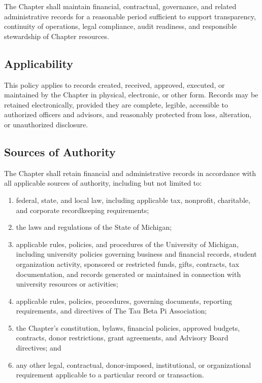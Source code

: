 The Chapter shall maintain financial, contractual, governance, and related administrative records for a reasonable 
period sufficient to support transparency, continuity of operations, legal compliance, audit readiness, and responsible stewardship of Chapter resources.

\subsection{Applicability} \label{XII.1}
This policy applies to records created, received, approved, executed, or maintained by the Chapter in physical, electronic, or other form. 
Records may be retained electronically, provided they are complete, legible, accessible to authorized officers and advisors, and 
reasonably protected from loss, alteration, or unauthorized disclosure.

\subsection{Sources of Authority} \label{XII.2}
The Chapter shall retain financial and administrative records in accordance with all applicable sources of authority, including but not limited to:
\begin{enumerate}
    \item federal, state, and local law, including applicable tax, nonprofit, charitable, and corporate recordkeeping requirements;
    \item the laws and regulations of the State of Michigan;
    \item applicable rules, policies, and procedures of the University of Michigan, including university policies governing business and financial records, 
    student organization activity, sponsored or restricted funds, gifts, contracts, tax documentation, and records generated or maintained in connection with university resources or activities;
    \item applicable rules, policies, procedures, governing documents, reporting requirements, and directives of The Tau Beta Pi Association;
    \item the Chapter’s constitution, bylaws, financial policies, approved budgets, contracts, donor restrictions, grant agreements, and Advisory Board directives; and
    \item any other legal, contractual, donor-imposed, institutional, or organizational requirement applicable to a particular record or transaction.
\end{enumerate}

